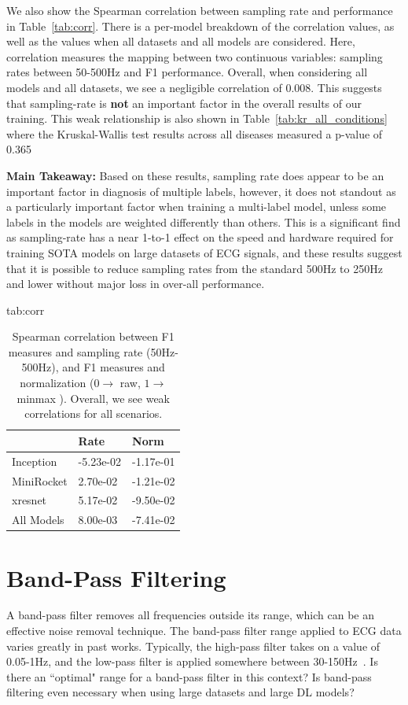 \documentclass[pmlr,twocolumn]{jmlr}%
\begin{document}
We also show the Spearman correlation between sampling rate and performance in Table~\ref{tab:corr}. There is a per-model breakdown of the correlation values, as well as the values when all datasets and all models are considered. Here, correlation measures the mapping between two continuous variables: sampling rates between 50-500Hz and F1 performance. Overall, when considering all models and all datasets, we see a negligible correlation of $0.008$. This suggests that sampling-rate is \textbf{not} an important factor in the overall results of our training. This weak relationship is also shown in   Table~\ref{tab:kr_all_conditions} where the Kruskal-Wallis test results across all diseases measured a p-value of 0.365


\textbf{Main Takeaway:} Based on these results, sampling rate does appear to be an important factor in diagnosis of multiple labels, however, it does not standout as a particularly important factor when training a multi-label model, unless some labels in the models are weighted differently than others. This is a significant find as sampling-rate has a near 1-to-1 effect on the speed and hardware required for training SOTA models on large datasets of ECG signals, and these results suggest that it is possible to reduce sampling rates from the standard 500Hz to 250Hz and lower without major loss in over-all performance. 

\begin{table}[htbp]
\floatconts
  {tab:corr}
  {\caption{Spearman correlation between F1 measures and sampling rate (50Hz-500Hz), and F1 measures and normalization ($0 \xrightarrow{}$ raw, $1 \xrightarrow{} $ minmax ). Overall, we see weak correlations for all scenarios.}}
  {\begin{tabular}{|l|l|l|}
  \hline
   & \bfseries Rate & \bfseries Norm \\\hline
  
  Inception  & -5.23e-02 & -1.17e-01  \\
  MiniRocket &  2.70e-02 & -1.21e-02  \\
  xresnet    & 5.17e-02 & -9.50e-02 \\
  \hline
  All Models & 8.00e-03 & -7.41e-02\\
  \hline
  \end{tabular}}
\end{table}

\section{Band-Pass Filtering}
\label{sec:BandPass}
A band-pass filter removes all frequencies outside its range, which can be an effective noise removal technique. The band-pass filter range applied to ECG data varies greatly in past works. Typically, the high-pass filter takes on a value of 0.05-1Hz, and the low-pass filter is applied somewhere between 30-150Hz~\citep{uwaechia2021comprehensive,luo2010review}. Is there an ``optimal" range for a band-pass filter in this context? Is band-pass filtering even necessary when using large datasets and large DL models?
\end{document}

